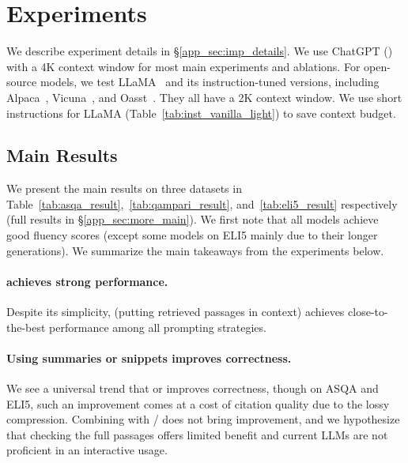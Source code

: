 
\section{Experiments}
\label{sec:experiments}






We describe experiment details in \S\ref{app_sec:imp_details}. 
We use ChatGPT () with a 4K context window for most main experiments and ablations. 
For open-source models, we test LLaMA~\citep{touvron2023llama} and 
its instruction-tuned versions, including 
Alpaca~\citep{alpaca}, Vicuna~\citep{vicuna2023}, and Oasst~\citep{kopf2023openassistant}.
They all have a 2K context window.
We use short instructions for LLaMA (Table~\ref{tab:inst_vanilla_light}) to save  context budget.



\subsection{Main Results}
We present the main results on three datasets in 
Table~\ref{tab:asqa_result},~\ref{tab:qampari_result}, and~\ref{tab:eli5_result} respectively (full results in \S\ref{app_sec:more_main}). %
We first note that all models achieve good fluency scores (except some models on ELI5 mainly due to their longer generations).
We summarize the main takeaways from the experiments below.

\paragraph{\tf{\textsc{\pvani{}}} achieves strong performance.}
Despite its simplicity,
\vani{} (putting retrieved passages in context)
achieves close-to-the-best performance among all prompting strategies. %



\paragraph{Using summaries or snippets improves correctness.}
We see a universal trend that 
\summ{} or \snippet{} 
improves  correctness,
though
on ASQA and ELI5, such an improvement comes at a cost of citation quality
due to the lossy compression. %
Combining \interact{} with \summ{}/\snippet{} does not bring improvement,
and we hypothesize that 
checking the full passages offers limited benefit and 
 current LLMs are not proficient in an interactive usage.






